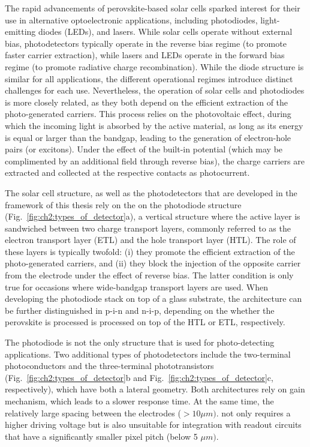 The rapid advancements of perovskite-based solar cells sparked interest for their use in alternative optoelectronic applications, including photodiodes, light-emitting diodes (LEDs), and lasers. While solar cells operate without external bias, photodetectors typically operate in the reverse bias regime (to promote faster carrier extraction), while lasers and LEDs operate in the forward bias regime (to promote radiative charge recombination). While the diode structure is similar for all applications, the different operational regimes introduce distinct challenges for each use. Nevertheless, the operation of solar cells and photodiodes is more closely related, as they both depend on the efficient extraction of the photo-generated carriers. This process relies on the photovoltaic effect, during which the incoming light is absorbed by the active material, as long as its energy is equal or larger than the bandgap, leading to the generation of electron-hole pairs (or excitons). Under the effect of the built-in potential (which may be complimented by an additional field through reverse bias), the charge carriers are extracted and collected at the respective contacts as photocurrent. 

The solar cell structure, as well as the photodetectors that are developed in the framework of this thesis rely on the on the photodiode structure (Fig.~\ref{fig:ch2:types_of_detector}a), a vertical structure where the active layer is sandwiched between two charge transport layers, commonly referred to as the electron transport layer (ETL) and the hole transport layer (HTL). The role of these layers is typically twofold: (i) they promote the efficient extraction of the photo-generated carriers, and (ii) they block the injection of the opposite carrier from the electrode under the effect of reverse bias. The latter condition is only true for occasions where wide-bandgap transport layers are used. When developing the photodiode stack on top of a glass substrate, the architecture can be further distinguished in p-i-n and n-i-p, depending on the whether the perovskite is processed is processed on top of the HTL or ETL, respectively. 

The photodiode is not the only structure that is used for photo-detecting applications. Two additional types of photodetectors include the two-terminal photoconductors and the three-terminal phototransistors (Fig.~\ref{fig:ch2:types_of_detector}b and Fig.~\ref{fig:ch2:types_of_detector}c, respectively), which have both a lateral geometry. Both architectures rely on gain mechanism, which leads to a slower response time. At the same time, the relatively large spacing between the electrodes ($> 10 \mu m)$. not only requires a higher driving voltage but is also unsuitable for integration with readout circuits that have a significantly smaller pixel pitch (below 5 $\mu m)$.

